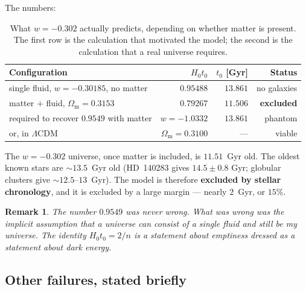 \documentclass[11pt,a4paper]{article}
\newtheorem{remark}[theorem]{Remark}
\theoremstyle{definition}
\newcommand{\Omm}{\Omega_{\mathrm{m}}}
\newcommand{\Hzt}{H_0 t_0}
\begin{document}
The numbers:

\begin{table}[h]
\centering
\small
\caption{What $w = -0.302$ actually predicts, depending on whether matter is
present. The first row is the calculation that motivated the model; the
second is the calculation that a real universe requires.}
\label{tab:artifact}
\begin{tabular}{@{}lrrr@{}}
\toprule
Configuration & $\Hzt$ & $t_0$ [Gyr] & Status \\
\midrule
single fluid, $w = -0.30185$, no matter & $0.95488$ & $13.861$ & no galaxies \\
matter $+$ fluid, $\Omm = 0.3153$ & $0.79267$ & $11.506$ & \textbf{excluded} \\
\midrule
required to recover $0.9549$ with matter & $w = -1.0332$ & $13.861$ & phantom \\
or, in $\Lambda$CDM & $\Omm = 0.3100$ & --- & viable \\
\bottomrule
\end{tabular}
\end{table}

The $w = -0.302$ universe, once matter is included, is $11.51$~Gyr old. The
oldest known stars are $\sim 13.5$~Gyr old (HD~140283 gives $14.5 \pm 0.8$
Gyr; globular clusters give $\sim 12.5$--$13$~Gyr). The model is therefore
\textbf{excluded by stellar chronology}, and it is excluded by a large margin
--- nearly $2$~Gyr, or $15\%$.

\begin{remark}
The number $0.9549$ was never wrong. What was wrong was the implicit
assumption that a universe can consist of a single fluid and still be
\emph{my} universe. The identity $\Hzt = 2/n$ is a statement about
emptiness dressed as a statement about dark energy.
\end{remark}

\subsection{Other failures, stated briefly}
\end{document}
